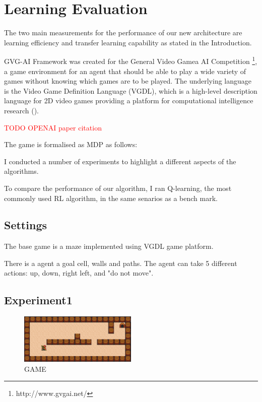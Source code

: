\section{Learning Evaluation}
\label{learning_evaluation}

The two main measurements for the performance of our new architecture are learning efficiency and transfer learning capability as stated in the Introduction.

GVG-AI Framework was created for the General Video Gamea AI Competition \footnote{http://www.gvgai.net/}, 
a game environment for an agent that should be able to play a wide variety of games without knowing which games are to be played.
The underlying language is the Video Game Definition Language (VGDL), which is a high-level description language for 2D video games providing a platform for computational intelligence research (\cite{Schaul2013}).

\textcolor{red}{TODO OPENAI paper citation}

The game is formalised as MDP as follows:

I conducted a number of experiments to highlight a different aspects of the algorithms. 

To compare the performance of our algorithm, I ran Q-learning, the most commonly used RL algorithm, in the same senarios as a bench mark. 

\subsection{Settings}
The base game is a maze implemented using VGDL game platform. 

There is a agent a goal cell, walls and paths. The agent can take 5 different actions: up, down, right left, and "do not move".  

\subsection{Experiment1}

\begin{figure}[!htb]
\centering
\includegraphics[width=0.5\textwidth]{./figures/experiment1}
\caption{GAME }
\label{experiment1}
\end{figure}

